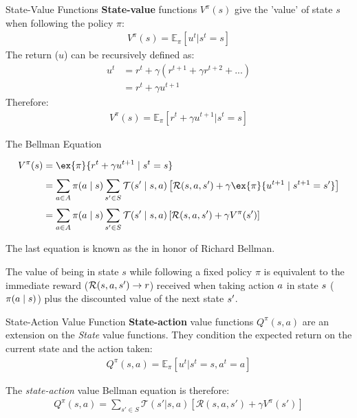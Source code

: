 \begin{frame}{State-Value Functions}
    \textbf{State-value} functions $V^{\pi}(s)$ give the 'value' of state $s$ when following the policy $\pi$:
    \begin{align*}
    V^{\pi}(s) = \mathbb{E}_\pi \left[u^{t} | s^{t} = s \right]
    \end{align*}
    \pause
    The return ($u$) can be recursively defined as:
    \begin{align*}
            u^t &= r^t +\gamma (r^{t+1} + \gamma r^{t+2} + ... )  \\ &= r^t + \gamma u^{t+1}
    \end{align*}
	\pause
    Therefore:
    \begin{align*}
        V^{\pi}(s) = \mathbb{E}_\pi \left[r^t + \gamma u^{t+1}| s^{t} = s \right]
    \end{align*}
\end{frame}

\begin{frame}[t]{The Bellman Equation}

    \begin{align*}
        V^{\pi}(\st) &= \ex{\pi}{\rew^t + \gamma u^{t+1} \mid \st^{t} = \st } \\[3pt]
                   &= \sum_{\ac \in \Ac} \pi(\ac \mid \st) \sum_{\st' \in \St} \Stf(\st'\mid \st, \ac) \left[\Rew(\st, \ac, \st') + \gamma \ex{\pi}{u^{t+1} \mid \st^{t+1} = \st'}\right] \\[3pt]
                   &= \sum_{\ac \in \Ac} \pi(\ac \mid \st) \sum_{\st' \in \St} \Stf(\st'\mid \st, \ac) \left[\Rew(\st, \ac, \st') + \gamma V^{\pi}(\st')\right]
    \end{align*}
    
    The last equation is known as the  in honor of Richard Bellman. 
    
    \blist
        \item The value of being in state $s$ while following a fixed policy $\pi$ is equivalent to the immediate reward ($\mathcal{R}(s, a, s') \to r$) received when taking action $a$ in state $s$ ($\pi(a \mid s)$) plus the discounted value of the next state $s'$. 
    \elist
\end{frame}

\begin{frame}{State-Action Value Function}
    \textbf{State-action} value functions $Q^{\pi}(s,a)$ are an extension on the \textit{State} value functions. They condition the expected return on the current state and the action taken:
    \begin{align*}
         Q^{\pi}(s,a) = \mathbb{E}_{\pi}\left[u^{t}|s^{t}=s, a^{t}=a\right]
    \end{align*}

The \textit{state-action} value Bellman equation is therefore:
\vspace{10pt}
\begin{align*}
    Q^{\pi}(s,a) = \sum_{s' \in S} \mathcal{T}(s'|s,a) \left[\mathcal{R}(s,a,s') + \gamma V^{\pi}(s')\right]
\end{align*}

\end{frame}

